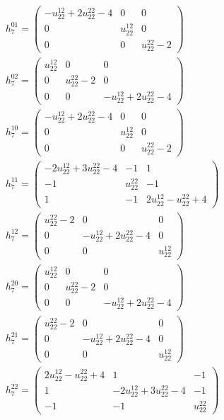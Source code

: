 \documentclass[a4paper, 11pt, twoside, onecolumn]{article}
\begin{document}
\begin{landscape}
\begin{gather*}
	 h_7^{01}=\begin{pmatrix}- u^{12}_{22} + 2 u^{22}_{22} - 4 & 0 & 0\\0 & u^{12}_{22} & 0\\0 & 0 & u^{22}_{22} - 2\end{pmatrix}\\ 
	 h_7^{02}=\begin{pmatrix}u^{12}_{22} & 0 & 0\\0 & u^{22}_{22} - 2 & 0\\0 & 0 & - u^{12}_{22} + 2 u^{22}_{22} - 4\end{pmatrix}\\ 
	 h_7^{10}=\begin{pmatrix}- u^{12}_{22} + 2 u^{22}_{22} - 4 & 0 & 0\\0 & u^{12}_{22} & 0\\0 & 0 & u^{22}_{22} - 2\end{pmatrix}\\ 
	 h_7^{11}=\begin{pmatrix}- 2 u^{12}_{22} + 3 u^{22}_{22} - 4 & -1 & 1\\-1 & u^{22}_{22} & -1\\1 & -1 & 2 u^{12}_{22} - u^{22}_{22} + 4\end{pmatrix}\\ 
	 h_7^{12}=\begin{pmatrix}u^{22}_{22} - 2 & 0 & 0\\0 & - u^{12}_{22} + 2 u^{22}_{22} - 4 & 0\\0 & 0 & u^{12}_{22}\end{pmatrix}\\ 
	 h_7^{20}=\begin{pmatrix}u^{12}_{22} & 0 & 0\\0 & u^{22}_{22} - 2 & 0\\0 & 0 & - u^{12}_{22} + 2 u^{22}_{22} - 4\end{pmatrix}\\ 
	 h_7^{21}=\begin{pmatrix}u^{22}_{22} - 2 & 0 & 0\\0 & - u^{12}_{22} + 2 u^{22}_{22} - 4 & 0\\0 & 0 & u^{12}_{22}\end{pmatrix}\\ 
	 h_7^{22}=\begin{pmatrix}2 u^{12}_{22} - u^{22}_{22} + 4 & 1 & -1\\1 & - 2 u^{12}_{22} + 3 u^{22}_{22} - 4 & -1\\-1 & -1 & u^{22}_{22}\end{pmatrix}\\ 

\end{gather*}
\end{landscape}
\end{document}
